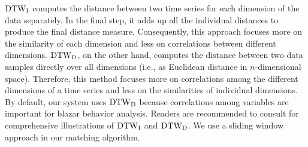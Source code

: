 ${\rm DTW}_{\rm I}$ computes the distance between two time series for each dimension of the data separately. %
In the final step, it adds up all the individual distances to produce the final distance measure.
Consequently, this approach focuses more on the similarity of each dimension and less on correlations between different dimensions.
${\rm DTW}_{\rm D}$, on the other hand, computes the distance between two data samples directly over all dimensions (i.e., as Euclidean distance in $n$-dimensional space).
Therefore, this method focuses more on correlations among the different dimensions of a time series and less on the similarities of individual dimensions. 
By default, our system uses ${\rm DTW}_{\rm D}$ because correlations among variables are important for blazar behavior analysis.
Readers are recommended to consult \cite[Fig. 1]{Shokoohi-Yekta2015} for comprehensive illustrations of ${\rm DTW}_{\rm I}$ and ${\rm DTW}_{\rm D}$.
We use a sliding window approach in our matching algorithm.
